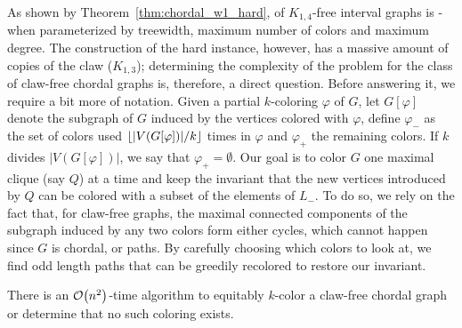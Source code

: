As shown by Theorem~\ref{thm:chordal_w1_hard},  of $K_{1,4}$-free interval graphs is \W[1]-\Hard when parameterized by treewidth, maximum number of colors and maximum degree.
The construction of the hard instance, however, has a massive amount of copies of the claw ($K_{1,3}$); determining the complexity of the problem for the class of claw-free chordal graphs is, therefore, a direct question. 
Before answering it, we require a bit more of notation.
Given a partial $k$-coloring $\varphi$ of $G$, let $G[\varphi]$ denote the subgraph of $G$ induced by the vertices colored with $\varphi$, define $\varphi_-$ as the set of colors used $\left\lfloor|V(G[\varphi])|/k\right\rfloor$ times in $\varphi$ and $\varphi_+$ the remaining colors.
If $k$ divides $|V(G[\varphi])|$, we say that $\varphi_+ = \emptyset$.
Our goal is to color $G$ one maximal clique (say $Q$) at a time and keep the invariant that the new vertices introduced by $Q$ can be colored with a subset of the elements of $L_-$.
To do so, we rely on the fact that, for claw-free graphs, the maximal connected components of the subgraph induced by any two colors form either cycles, which cannot happen since $G$ is chordal, or paths.
By carefully choosing which colors to look at, we find odd length paths that can be greedily recolored to restore our invariant.

\begin{lemma}
    \label{lem:claw_free_chordal}
    There is an $\mathcal{O}\!\left(n^2\right)$-time algorithm to equitably $k$-color a claw-free chordal graph or determine that no such coloring exists.
\end{lemma}

